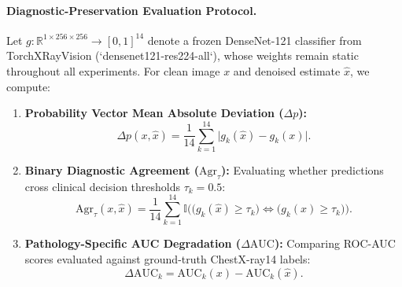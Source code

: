 \documentclass[11pt]{article}
\begin{document}
\paragraph{Diagnostic-Preservation Evaluation Protocol.}
Let $g: \mathbb{R}^{1 \times 256 \times 256} \to [0, 1]^{14}$ denote a frozen DenseNet-121 classifier from TorchXRayVision \citep{cohen2022torchxrayvision} (`densenet121-res224-all`), whose weights remain static throughout all experiments. For clean image $x$ and denoised estimate $\hat{x}$, we compute:
\begin{enumerate}[leftmargin=*]
  \item \textbf{Probability Vector Mean Absolute Deviation ($\Delta p$):}
  \begin{equation}
    \Delta p(x, \hat{x}) = \frac{1}{14} \sum_{k=1}^{14} \big| g_k(\hat{x}) - g_k(x) \big|.
  \end{equation}
  \item \textbf{Binary Diagnostic Agreement ($\mathrm{Agr}_\tau$):}
  Evaluating whether predictions cross clinical decision thresholds $\tau_k = 0.5$:
  \begin{equation}
    \mathrm{Agr}_\tau(x, \hat{x}) = \frac{1}{14} \sum_{k=1}^{14} \mathbb{I}\Big( \big(g_k(\hat{x}) \ge \tau_k\big) \iff \big(g_k(x) \ge \tau_k\big) \Big).
  \end{equation}
  \item \textbf{Pathology-Specific AUC Degradation ($\Delta \mathrm{AUC}$):}
  Comparing ROC-AUC scores evaluated against ground-truth ChestX-ray14 labels:
  \begin{equation}
    \Delta \mathrm{AUC}_k = \mathrm{AUC}_k(x) - \mathrm{AUC}_k(\hat{x}).
  \end{equation}
\end{enumerate}
\end{document}
